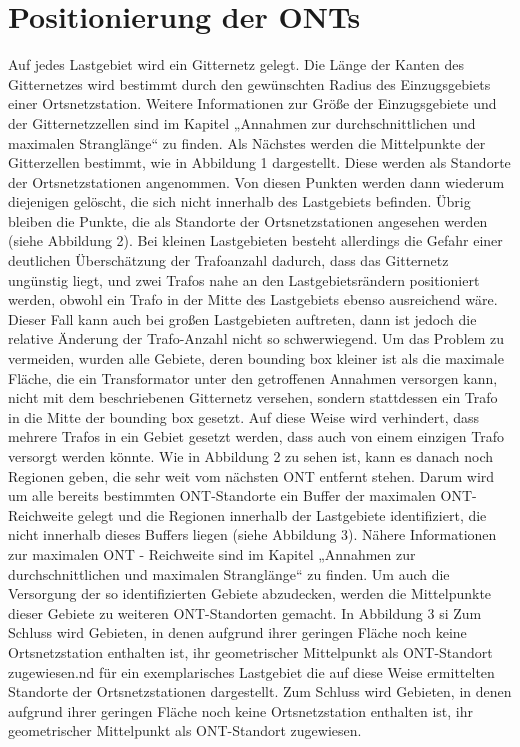 \documentclass[11pt]{scrreprt}
\begin{document}
\chapter{Positionierung der ONTs}
\label{sec:Positionierung der ONTs}

Auf jedes Lastgebiet wird ein Gitternetz gelegt. Die Länge der Kanten des Gitternetzes wird bestimmt durch den gewünschten Radius des Einzugsgebiets einer Ortsnetzstation. Weitere Informationen zur Größe der Einzugsgebiete und der Gitternetzzellen sind im Kapitel  „Annahmen zur durchschnittlichen und maximalen Stranglänge“  zu finden. Als Nächstes werden die Mittelpunkte der Gitterzellen bestimmt, wie in Abbildung 1 dargestellt. Diese werden als Standorte der Ortsnetzstationen angenommen. Von diesen Punkten werden dann wiederum diejenigen gelöscht, die sich nicht innerhalb des Lastgebiets befinden. Übrig bleiben die Punkte, die als Standorte der Ortsnetzstationen angesehen werden (siehe Abbildung 2).
Bei kleinen Lastgebieten besteht allerdings die Gefahr einer deutlichen Überschätzung der Trafoanzahl dadurch, dass das Gitternetz ungünstig liegt, und zwei Trafos nahe an den Lastgebietsrändern positioniert werden, obwohl ein Trafo in der Mitte des Lastgebiets ebenso ausreichend wäre. Dieser Fall kann auch bei großen Lastgebieten auftreten, dann ist jedoch die relative Änderung der Trafo-Anzahl nicht so schwerwiegend. Um das Problem zu vermeiden, wurden alle Gebiete, deren bounding box kleiner ist als die maximale Fläche, die ein Transformator unter den getroffenen Annahmen versorgen kann, nicht mit dem beschriebenen Gitternetz versehen, sondern stattdessen ein Trafo in die Mitte der bounding box gesetzt. Auf diese Weise wird verhindert, dass mehrere Trafos in ein Gebiet gesetzt werden, dass auch von einem einzigen Trafo versorgt werden könnte. Wie in Abbildung 2 zu sehen ist, kann es danach noch Regionen geben, die sehr weit vom nächsten ONT entfernt stehen. Darum wird um alle bereits bestimmten ONT-Standorte ein Buffer der maximalen ONT-Reichweite gelegt und die Regionen innerhalb der Lastgebiete identifiziert, die nicht innerhalb dieses Buffers liegen (siehe Abbildung 3). Nähere Informationen zur maximalen ONT - Reichweite sind im Kapitel „Annahmen zur durchschnittlichen und maximalen Stranglänge“ zu finden. Um auch die Versorgung der so identifizierten Gebiete abzudecken, werden die Mittelpunkte dieser Gebiete zu weiteren ONT-Standorten gemacht. In Abbildung 3 si Zum Schluss wird Gebieten, in denen aufgrund ihrer geringen Fläche noch keine Ortsnetzstation enthalten ist, ihr geometrischer Mittelpunkt als ONT-Standort zugewiesen.nd für ein exemplarisches Lastgebiet die auf diese Weise ermittelten Standorte der Ortsnetzstationen dargestellt. Zum Schluss wird Gebieten, in denen aufgrund ihrer geringen Fläche noch keine Ortsnetzstation enthalten ist, ihr geometrischer Mittelpunkt als ONT-Standort zugewiesen.
\end{document}
